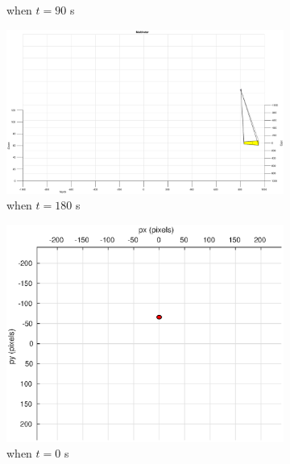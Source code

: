 \begin{figure}[htbp]
\begin{subfigure}[t]{0.32\linewidth}
		\caption{when $t=90$ s}
	\end{subfigure}
	\begin{subfigure}[t]{0.32\linewidth}
		\includegraphics[width=\textwidth]{images/chapter4/inertial_UAV_5mps_180s}
		\caption{when $t=180$ s}
	\end{subfigure}
	\begin{subfigure}[t]{0.32\linewidth}
		\includegraphics[width=\textwidth]{images/chapter4/inertial_camera_5mps}
		\caption{when $t=0$ s}
	\end{subfigure}
	\begin{subfigure}[t]{0.32\linewidth}

\end{subfigure}
\end{figure}
